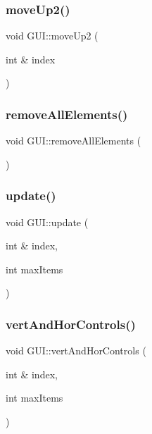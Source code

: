 \mbox{\label{class_g_u_i_a9b5355f35e5c12d0afea2d3563ab892f}} 
\subsubsection{\texorpdfstring{moveUp2()}{moveUp2()}}
{\footnotesize\ttfamily void G\+U\+I\+::move\+Up2 (\begin{DoxyParamCaption}\item[{int \&}]{index }\end{DoxyParamCaption})}

\mbox{\label{class_g_u_i_ae36c26f75d117499a455ea8890236877}} 
\subsubsection{\texorpdfstring{removeAllElements()}{removeAllElements()}}
{\footnotesize\ttfamily void G\+U\+I\+::remove\+All\+Elements (\begin{DoxyParamCaption}{ }\end{DoxyParamCaption})}

\mbox{\label{class_g_u_i_a055693c460f0441b193681e7f9d52766}} 
\subsubsection{\texorpdfstring{update()}{update()}}
{\footnotesize\ttfamily void G\+U\+I\+::update (\begin{DoxyParamCaption}\item[{int \&}]{index,  }\item[{int}]{max\+Items }\end{DoxyParamCaption})}

\mbox{\label{class_g_u_i_a5730f413878465634efb65a1602e4ddf}} 
\subsubsection{\texorpdfstring{vertAndHorControls()}{vertAndHorControls()}}
{\footnotesize\ttfamily void G\+U\+I\+::vert\+And\+Hor\+Controls (\begin{DoxyParamCaption}\item[{int \&}]{index,  }\item[{int}]{max\+Items }\end{DoxyParamCaption})}

